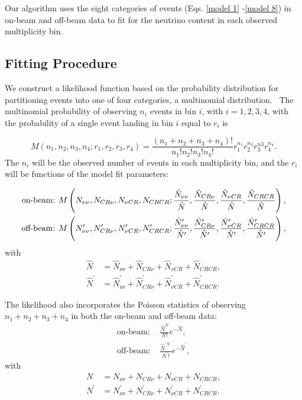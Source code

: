 \documentclass{article}
\begin{document}
Our algorithm uses the eight categories of events (Eqs. \ref{model 1}%
-\ref{model 8}) in on-beam and off-beam data to fit for the neutrino content
in each observed multiplicity bin.

\subsection{Fitting Procedure}

We construct a likelihood function based on the probability distribution for
partitioning events into one of four categories, a multinomial distribution.
\ The multinomial probability of observing $n_{i}$ events in bin $i$, with $%
i=1,2,3,4$, with the probability of a single event landing in bin $i$ equal
to $r_{i}$ is

\begin{equation}
M\left( n_{1},n_{2},n_{3},n_{4};r_{1},r_{2},r_{3},r_{4}\right) =\frac{\left(
n_{1}+n_{2}+n_{3}+n_{4}\right) !}{n_{1}!n_{2}!n_{3}!n_{4}!}%
r_{1}^{n_{1}}r_{2}^{n_{2}}r_{3}^{n3}r_{4}^{n_{4}}.
\end{equation}
The $n_{i}$ will be the observed number of events in each multiplicity bin, and the $%
r_{i} $ will be functions of the model fit parameters:

\begin{align}
\text{on-beam}\text{: } & M\left( N_{\nu\nu},N_{CR\nu},N_{\nu CR},N_{CRCR};%
\frac{\hat{N}_{\nu\nu}}{\hat{N}},\frac{\hat{N}_{CR\nu}}{\hat{N}},\frac{\hat{N%
}_{\nu CR}}{\hat{N}},\frac{\hat{N}_{CRCR}}{\hat{N}}\right) , \\
\text{off-beam}\text{: } & M\left( N_{\nu\nu}^{\prime},N_{CR\nu}^{\prime
},N_{\nu CR}^{\prime},N_{CRCR}^{\prime};\frac{\hat{N}_{\nu\nu}^{\prime}}{%
\hat{N}^{\prime}},\frac{\hat{N}_{CR\nu}^{\prime}}{\hat{N}^{\prime}},\frac{%
\hat{N}_{\nu CR}^{\prime}}{\hat{N}^{\prime}},\frac{\hat{N}_{CRCR}^{\prime}}{\hat{N}%
^{\prime}}\right) ,
\end{align}
with%
\begin{align}
\hat{N} & =\hat{N}_{\nu\nu}+\hat{N}_{CR\nu}+\hat{N}_{\nu CR}+\hat{N}_{CRCR},
\\
\hat{N}^{\prime} & =\hat{N}_{\nu\nu}^{\prime}+\hat{N}_{CR\nu}^{\prime}+\hat{N%
}_{\nu CR}^{\prime}+\hat{N}_{CRCR}^{\prime}.
\end{align}

The likelihood also incorporates the Poisson statistics of observing $%
n_{1}+n_{2}+n_{3}+n_{4}$ in both the on-beam and off-beam data:%
\begin{align}
\text{on-beam}\text{: } & \frac{\hat{N}^{N}}{N!}e^{-\hat{N}}, \\
\text{off-beam}\text{: } & \frac{\hat{N}^{\prime N^{\prime}}}{N^{\prime}!}%
e^{-\hat{N}^{\prime}},
\end{align}
with%
\begin{align}
N & =N_{\nu\nu}+N_{CR\nu}+N_{\nu CR}+N_{CRCR}, \\
N^{\prime} & =N_{\nu\nu}^{\prime}+N_{CR\nu}^{\prime}+N_{\nu CR}^{\prime
}+N_{CRCR}^{\prime}.
\end{align}
\end{document}
